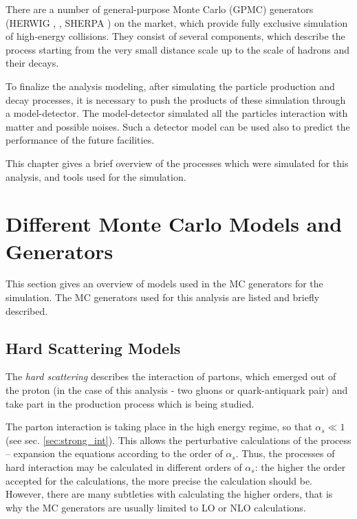 There are a number of general-purpose Monte Carlo (GPMC) generators (HERWIG \cite{Corcella:2000bw},  \cite{Sjostrand:2006za}, SHERPA \cite{Gleisberg:2003xi})
on the market, which provide fully exclusive simulation of high-energy collisions. They consist of several components,
which describe the process starting from the very small distance scale up to the scale of hadrons and their decays. 

To finalize the analysis modeling, after simulating the particle production and decay processes, it is necessary 
to push the products of these simulation through a model-detector. The model-detector simulated all the particles 
interaction with matter and possible noises. Such a detector model can be used also to predict the performance 
of the future facilities.

This chapter gives a brief overview of the processes which were simulated for this analysis, and tools used for 
the simulation.

\section{Different Monte Carlo Models and Generators}

This section gives an overview of models used in the MC generators for the simulation. The MC generators used
for this analysis are listed and briefly described.

\subsection{Hard Scattering Models}

The \textit{hard scattering} describes the interaction of partons, which emerged out of the proton (in the case of 
this analysis - two gluons or quark-antiquark pair) and take part in the production process which is being studied.

The parton interaction is taking place in the high energy regime, so that $\alpha_{s} \ll 1$ (see sec. \ref{sec:strong_int}). 
This allows the perturbative calculations of the process -- expansion the equations according to the order of $\alpha_{s}$.
Thus, the processes of hard interaction may be calculated in different orders of $\alpha_{s}$: the higher the order accepted
for the calculations, the more precise the calculation should be. However, there are many subtleties with calculating the 
higher orders, that is why the MC generators are usually limited to LO or NLO calculations.

